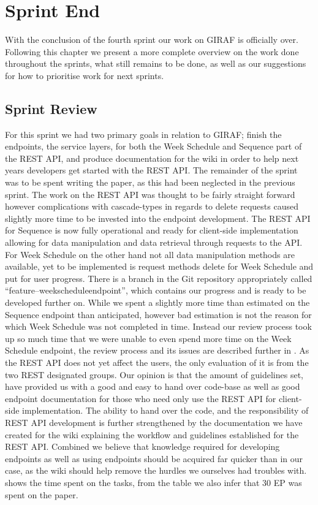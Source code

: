\chapter{Sprint End}
With the conclusion of the fourth sprint our work on GIRAF is officially over.
Following this chapter we present a more complete overview on the work done throughout the sprints, what still remains to be done, as well as our suggestions for how to prioritise work for next sprints.

\section{Sprint Review}
For this sprint we had two primary goals in relation to GIRAF; finish the endpoints, the service layers, for both the Week Schedule and Sequence part of the REST API, and produce documentation for the wiki in order to help next years developers get started with the REST API.
The remainder of the sprint was to be spent writing the paper, as this had been neglected in the previous sprint.
The work on the REST API was thought to be fairly straight forward however complications with cascade-types in regards to delete requests caused slightly more time to be invested into the endpoint development.
The REST API for Sequence is now fully operational and ready for client-side implementation allowing for data manipulation and data retrieval through requests to the API.
For Week Schedule on the other hand not all data manipulation methods are available, yet to be implemented is request methods delete for Week Schedule and put for user progress.
There is a branch in the Git repository appropriately called ``feature--weekscheduleendpoint'', which contains our progress and is ready to be developed further on.
While we spent a slightly more time than estimated on the Sequence endpoint than anticipated, however bad estimation is not the reason for which Week Schedule was not completed in time.
Instead our review process took up so much time that we were unable to even spend more time on the Week Schedule endpoint, the review process and its issues are described further in .
As the REST API does not yet affect the users, the only evaluation of it is from the two REST designated groups.
Our opinion is that the amount of guidelines set, have provided us with a good and easy to hand over code-base as well as good endpoint documentation for those who need only use the REST API for client-side implementation.
The ability to hand over the code, and the responsibility of REST API development is further strengthened by the documentation we have created for the wiki explaining the workflow and guidelines established for the REST API.
Combined we believe that knowledge required for developing endpoints as well as using endpoints should be acquired far quicker than in our case, as the wiki should help remove the hurdles we ourselves had troubles with.
 shows the time spent on the tasks, from the table we also infer that 30 EP was spent on the paper.

